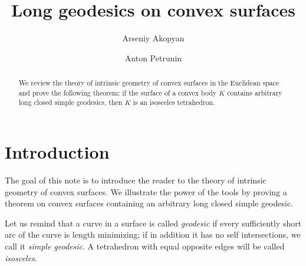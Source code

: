 \documentclass[oneside,a4paper, 12pt]{article}
\begin{document}
\title{Long geodesics on convex surfaces}
\author{Arseniy Akopyan
\and 
Anton Petrunin}
\newcommand{\Addresses}{{\bigskip\footnotesize

Arseniy Akopyan, 
\par\nopagebreak\textsc{Institute of Science and Technology Austria,} 
\par\nopagebreak\textsc{Am Campus 1, 3400 Klosterneuburg, Austria.}
\par\nopagebreak\textit{Email}: \texttt{akopjan@gmail.com}

\medskip

Anton Petrunin, 
\par\nopagebreak\textsc{Mathematics Department,} 
\par\nopagebreak\textsc{Pennsylvania State University,}
\par\nopagebreak\textsc{University Park, PA 16802, USA}
  \par\nopagebreak
  \textit{Email}: \texttt{petrunin@math.psu.edu}
}}
\date{}
\maketitle

\begin{abstract}
We review the theory of intrinsic geometry of convex surfaces in the Euclidean space and prove the following theorem: 
if the surface of a convex body $K$ contains arbitrary long closed simple geo\-de\-sics, then $K$ is an isosceles tetrahedron.
\end{abstract}


\section{Introduction}
The goal of this note is to introduce the reader to the theory of intrinsic geometry of convex surfaces.
We illustrate the power of the tools by proving a theorem on convex surfaces containing an arbitrary long closed simple geodesic. 

Let us remind that a curve in a surface is called \emph{geodesic} if every sufficiently short arc of the curve is length minimizing; if in addition it has no self intersections, we call it \emph{simple geodesic}.
A tetrahedron with equal opposite edges will be called \emph{isosceles}.
\end{document}
